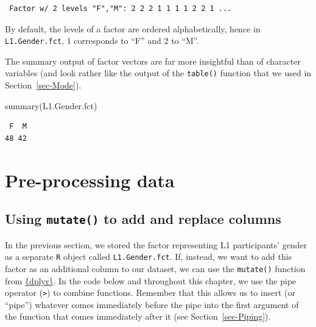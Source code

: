 \documentclass[
  letterpaper,
  DIV=11,
  numbers=noendperiod]{scrreprt}
\newenvironment{Shaded}{\begin{snugshade}}{\end{snugshade}}
\newcommand{\AttributeTok}[1]{\textcolor[rgb]{0.40,0.45,0.13}{#1}}
\newcommand{\FunctionTok}[1]{\textcolor[rgb]{0.28,0.35,0.67}{#1}}
\newcommand{\NormalTok}[1]{\textcolor[rgb]{0.00,0.23,0.31}{#1}}
\newcommand{\OtherTok}[1]{\textcolor[rgb]{0.00,0.23,0.31}{#1}}
\newcommand{\SpecialCharTok}[1]{\textcolor[rgb]{0.37,0.37,0.37}{#1}}
\begin{document}
\begin{verbatim}
 Factor w/ 2 levels "F","M": 2 2 2 1 1 1 1 2 2 1 ...
\end{verbatim}

By default, the levels of a factor are ordered alphabetically, hence in
\texttt{L1.Gender.fct}, 1 corresponds to ``F'' and 2 to ``M''.

The summary output of factor vectors are far more insightful than of
character variables (and look rather like the output of the
\texttt{table()} function that we used in Section~\ref{sec-Mode}).

\begin{Shaded}
\begin{Highlighting}[]
\FunctionTok{summary}\NormalTok{(L1.Gender.fct)}
\end{Highlighting}
\end{Shaded}

\begin{verbatim}
 F  M 
48 42 
\end{verbatim}

\section{Pre-processing data}\label{sec-Preprocessing}

\subsection{\texorpdfstring{Using \texttt{mutate()} to add and replace
columns}{Using mutate() to add and replace columns}}\label{sec-mutate}

In the previous section, we stored the factor representing L1
participants' gender as a separate \texttt{R} object called
\texttt{L1.Gender.fct}. If, instead, we want to add this factor as an
additional column to our dataset, we can use the \texttt{mutate()}
function from \href{https://dplyr.tidyverse.org/}{\{dplyr\}}. In the
code below and throughout this chapter, we use the pipe operator
(\texttt{\textbar{}\textgreater{}}) to combine functions. Remember that
this allows us to insert (or ``pipe'') whatever comes immediately before
the pipe into the first argument of the function that comes immediately
after it (see Section~\ref{sec-Piping}).

\begin{Shaded}
\end{Shaded}
\end{document}

